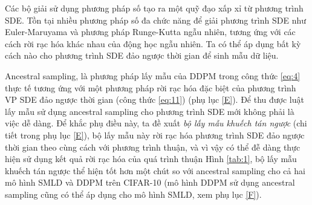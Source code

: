 \documentclass{article} %
\begin{document}
\begin{table}[h!]
    \centering
    \caption{So sánh các bộ giải phương trình SDE đảo ngược thời gian khác nhau trên tập CIFAR-10.
    Vùng tối màu thu được với cùng cách tính toán (số các hàm điểm số).
    Trung bình và độ lệch tiêu chuẩn được đưa ra trên 5 lần chạy.
    "P1000" hoặc "P2000": bộ lấy mẫu mà chỉ dự đoán sử dụng 1000 hoặc 2000 bước.
    "C2000": bộ lấy mẫu chỉ căn chỉnh sử dụng 2000 bước.
    "PC1000": Bộ lấy mẫu dự đoán căn chỉnh sử dụng 1000 bước dự đoán và 1000 bước căn chỉnh.}
    \label{tab:1}
\end{table}

Các bộ giải sử dụng phương pháp số tạo ra một quỹ đạo xấp xỉ từ phương trình SDE.
Tồn tại nhiều phương pháp số đa chức năng để giải phương trình SDE như Euler-Maruyama và phương pháp Runge-Kutta ngẫu nhiên, tương ứng với các cách rời rạc hóa khác nhau của động học ngẫu nhiên.
Ta có thể áp dụng bất kỳ cách nào cho phương trình SDE đảo ngược thời gian để sinh mẫu dữ liệu.

Ancestral sampling, là phương pháp lấy mẫu của DDPM trong công thức \ref{eq:4} thực tế tương ứng với một phương pháp rời rạc hóa đặc biệt của phương trình VP SDE đảo ngược thời gian (công thức \ref{eq:11}) (phụ lục \ref{E}).
Để thu được luật lấy mẫu sử dụng ancestral sampling cho phương trình SDE mới không phải là việc dễ dàng.
Để khắc phụ điều này, ta đề xuất \textit{bộ lấy mẫu khuếch tán ngược} (chi tiết trong phụ lục \ref{E}), bộ lấy mẫu này rời rạc hóa phương trình SDE đảo ngược thời gian theo cùng cách với phương trình thuận, và vì vậy có thể đễ dàng thực hiện sử dụng kết quả rời rạc hóa của quá trình thuận
Hình \ref{tab:1}, bộ lấy mẫu khuếch tán ngược thể hiện tốt hơn một chút so với ancestral sampling cho cả hai mô hình SMLD và DDPM trên CIFAR-10 (mô hình DDPM sử dụng ancestral sampling cũng có thể áp dụng cho mô hình SMLD, xem phụ lục \ref{F}).
\end{document}
